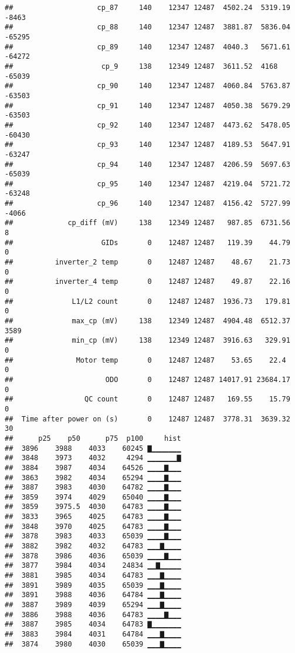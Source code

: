\documentclass[]{article}
\begin{document}
\begin{verbatim}
##                    cp_87     140    12347 12487  4502.24  5319.19  -8463
##                    cp_88     140    12347 12487  3881.87  5836.04 -65295
##                    cp_89     140    12347 12487  4040.3   5671.61 -64272
##                     cp_9     138    12349 12487  3611.52  4168    -65039
##                    cp_90     140    12347 12487  4060.84  5763.87 -63503
##                    cp_91     140    12347 12487  4050.38  5679.29 -63503
##                    cp_92     140    12347 12487  4473.62  5478.05 -60430
##                    cp_93     140    12347 12487  4189.53  5647.91 -63247
##                    cp_94     140    12347 12487  4206.59  5697.63 -65039
##                    cp_95     140    12347 12487  4219.04  5721.72 -63248
##                    cp_96     140    12347 12487  4156.42  5727.99  -4066
##             cp_diff (mV)     138    12349 12487   987.85  6731.56      8
##                     GIDs       0    12487 12487   119.39    44.79      0
##          inverter_2 temp       0    12487 12487    48.67    21.73      0
##          inverter_4 temp       0    12487 12487    49.87    22.16      0
##              L1/L2 count       0    12487 12487  1936.73   179.81      0
##              max_cp (mV)     138    12349 12487  4904.48  6512.37   3589
##              min_cp (mV)     138    12349 12487  3916.63   329.91      0
##               Motor temp       0    12487 12487    53.65    22.4       0
##                      ODO       0    12487 12487 14017.91 23684.17      0
##                 QC count       0    12487 12487   169.55    15.79      0
##  Time after power on (s)       0    12487 12487  3778.31  3639.32     30
##      p25    p50      p75  p100     hist
##  3896    3988    4033    60245 ▇▁▁▁▁▁▁▁
##  3848    3973    4032     4294 ▁▁▁▁▁▁▁▇
##  3884    3987    4034    64526 ▁▁▁▁▇▁▁▁
##  3863    3982    4034    65294 ▁▁▁▁▇▁▁▁
##  3887    3983    4030    64782 ▁▁▁▁▇▁▁▁
##  3859    3974    4029    65040 ▁▁▁▁▇▁▁▁
##  3859    3975.5  4030    64783 ▁▁▁▁▇▁▁▁
##  3833    3965    4025    64783 ▁▁▁▁▇▁▁▁
##  3848    3970    4025    64783 ▁▁▁▁▇▁▁▁
##  3878    3983    4033    65039 ▁▁▁▁▇▁▁▁
##  3882    3982    4032    64783 ▁▁▁▇▁▁▁▁
##  3878    3986    4036    65039 ▁▁▁▁▇▁▁▁
##  3877    3984    4034    24834 ▁▁▇▁▁▁▁▁
##  3881    3985    4034    64783 ▁▁▁▇▁▁▁▁
##  3891    3989    4035    65039 ▁▁▁▇▁▁▁▁
##  3891    3988    4036    64784 ▁▁▁▇▁▁▁▁
##  3887    3989    4039    65294 ▁▁▁▇▁▁▁▁
##  3886    3988    4036    64783 ▁▁▁▁▇▁▁▁
##  3887    3985    4034    64783 ▇▁▁▁▁▁▁▁
##  3883    3984    4031    64784 ▁▁▁▇▁▁▁▁
##  3874    3980    4030    65039 ▁▁▁▇▁▁▁▁

\end{verbatim}
\end{document}

